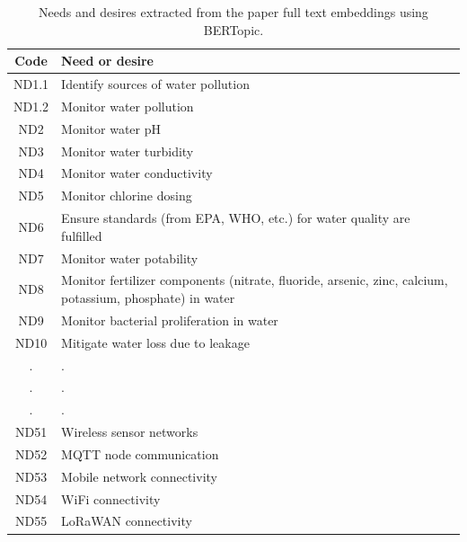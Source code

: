 \documentclass[conference]{IEEEtran}
\begin{document}
\begin{table}[b]
    \centering
    \caption{Needs and desires extracted from the paper full text embeddings using BERTopic.}
    \begin{tabular}{c p{6cm}}
        Code & Need or desire \\
        \hline
        ND1.1 & Identify sources of water pollution \\ %
        ND1.2 & Monitor water pollution \\ %
        ND2 & Monitor water pH \\ %
        ND3 & Monitor water turbidity \\ %
        ND4 & Monitor water conductivity \\ %
        ND5 & Monitor chlorine dosing \\ %
        ND6 & Ensure standards (from EPA, WHO, etc.) for water quality are fulfilled \\ %
        ND7 & Monitor water potability \\ %
        ND8 & Monitor fertilizer components (nitrate, fluoride, arsenic, zinc, calcium, potassium, phosphate) in water \\ %
        ND9 & Monitor bacterial proliferation in water \\ %
        ND10 & Mitigate water loss due to leakage \\ %
        
       . & . \\ %
        . & . \\ %
        . & . \\ %
        
       
        ND51 & Wireless sensor networks \\
        ND52 & MQTT node communication \\
        ND53 & Mobile network connectivity \\
        ND54 & WiFi connectivity \\
        ND55 & LoRaWAN connectivity \\
        \hline
    \end{tabular}
    \label{tab:clusters}
\end{table}
\end{document}
